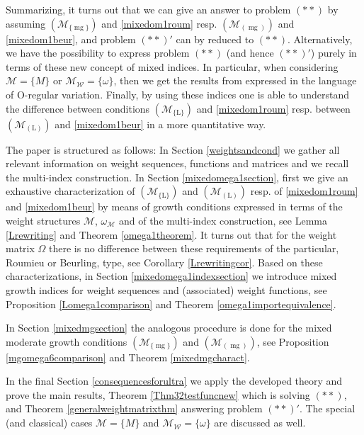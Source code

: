 \documentclass[10pt]{amsart}%
\numberwithin{equation}{section}
\theoremstyle{plain}
\let\on=\operatorname
\begin{document}
Summarizing, it turns out that we can give an answer to problem $(**)$ by assuming \hyperlink{R-mg}{$(\mathcal{M}_{\{\on{mg}\}})$} and \eqref{mixedom1roum} resp. \hyperlink{B-mg}{$(\mathcal{M}_{(\on{mg})})$} and \eqref{mixedom1beur}, and problem $(**)'$ can by reduced to $(**)$. Alternatively, we have the possibility to express problem $(**)$ (and hence $(**)'$) purely in terms of these new concept of mixed indices. In particular, when considering $\mathcal{M}=\{M\}$ or $\mathcal{M}_{\mathcal{W}}=\{\omega\}$, then we get the results from \cite{BonetMeiseMelikhov07} expressed in the language of O-regular variation. Finally, by using these indices one is able to understand the difference between conditions \hyperlink{R-L}{$(\mathcal{M}_{\{\text{L}\}})$} and \eqref{mixedom1roum} resp. between \hyperlink{B-L}{$(\mathcal{M}_{(\text{L})})$} and \eqref{mixedom1beur} in a more quantitative way.\vspace{6pt}

The paper is structured as follows: In Section \ref{weightsandcond} we gather all relevant information on weight sequences, functions and matrices and we recall the multi-index construction. In Section \ref{mixedomega1section}, first we give an exhaustive characterization of \hyperlink{R-L}{$(\mathcal{M}_{\{\text{L}\}})$} and \hyperlink{B-L}{$(\mathcal{M}_{(\text{L})})$} resp. of \eqref{mixedom1roum} and \eqref{mixedom1beur} by means of growth conditions expressed in terms of the weight structures $\mathcal{M}$, $\omega_{\mathcal{M}}$ and of the multi-index construction, see Lemma \ref{Lrewriting} and Theorem \ref{omega1theorem}. It turns out that for the weight matrix $\Omega$ there is no difference between these requirements of the particular, Roumieu or Beurling, type, see Corollary \ref{Lrewritingcor}. Based on these characterizations, in Section \ref{mixedomega1indexsection} we introduce mixed growth indices for weight sequences and (associated) weight functions, see Proposition \ref{Lomega1comparison} and Theorem \ref{omega1importequivalence}.\vspace{6pt}

In Section \ref{mixedmgsection} the analogous procedure is done for the mixed moderate growth conditions \hyperlink{R-mg}{$(\mathcal{M}_{\{\on{mg}\}})$} and \hyperlink{B-mg}{$(\mathcal{M}_{(\on{mg})})$}, see Proposition \ref{mgomega6comparison} and Theorem \ref{mixedmgcharact}.\vspace{6pt}

In the final Section \ref{consequencesforultra} we apply the developed theory and prove the main results, Theorem \ref{Thm32testfuncnew} which is solving $(**)$, and Theorem \ref{generalweightmatrixthm} answering problem $(**)'$. The special (and classical) cases $\mathcal{M}=\{M\}$ and $\mathcal{M}_{\mathcal{W}}=\{\omega\}$ are discussed as well.
\end{document}
